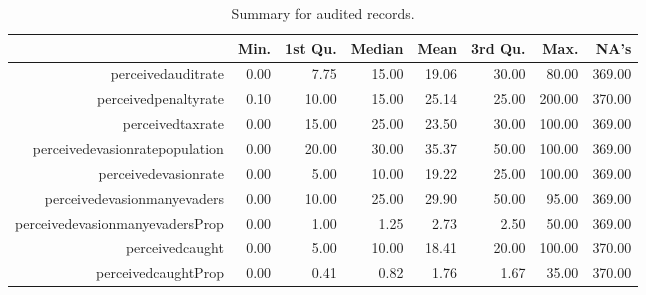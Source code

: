 \begin{table}[ht]
\footnotesize
\centering
\begin{tabular}{rrrrrrrr}
  \hline
 & Min. & 1st Qu. & Median & Mean & 3rd Qu. & Max. & NA's \\ 
  \hline
perceivedauditrate & 0.00 & 7.75 & 15.00 & 19.06 & 30.00 & 80.00 & 369.00 \\ 
  perceivedpenaltyrate & 0.10 & 10.00 & 15.00 & 25.14 & 25.00 & 200.00 & 370.00 \\ 
  perceivedtaxrate & 0.00 & 15.00 & 25.00 & 23.50 & 30.00 & 100.00 & 369.00 \\ 
  perceivedevasionratepopulation & 0.00 & 20.00 & 30.00 & 35.37 & 50.00 & 100.00 & 369.00 \\ 
  perceivedevasionrate & 0.00 & 5.00 & 10.00 & 19.22 & 25.00 & 100.00 & 369.00 \\ 
  perceivedevasionmanyevaders & 0.00 & 10.00 & 25.00 & 29.90 & 50.00 & 95.00 & 369.00 \\ 
  perceivedevasionmanyevadersProp & 0.00 & 1.00 & 1.25 & 2.73 & 2.50 & 50.00 & 369.00 \\ 
  perceivedcaught & 0.00 & 5.00 & 10.00 & 18.41 & 20.00 & 100.00 & 370.00 \\ 
  perceivedcaughtProp & 0.00 & 0.41 & 0.82 & 1.76 & 1.67 & 35.00 & 370.00 \\ 
   \hline
\end{tabular}
\caption{\label{tab:perceptions_summary_audited} Summary for  audited records.}
\end{table}

